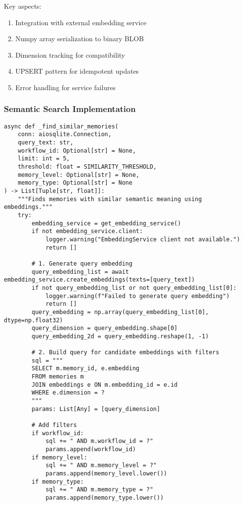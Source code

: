\documentclass[12pt,a4paper]{article}
\begin{document}
Key aspects:
\begin{enumerate}[label=\arabic*.]
    \item Integration with external embedding service
    \item Numpy array serialization to binary BLOB
    \item Dimension tracking for compatibility
    \item UPSERT pattern for idempotent updates
    \item Error handling for service failures
\end{enumerate}

\subsubsection*{Semantic Search Implementation}
\begin{pageablecode}
\begin{verbatim}
async def _find_similar_memories(
    conn: aiosqlite.Connection,
    query_text: str,
    workflow_id: Optional[str] = None,
    limit: int = 5,
    threshold: float = SIMILARITY_THRESHOLD,
    memory_level: Optional[str] = None,
    memory_type: Optional[str] = None
) -> List[Tuple[str, float]]:
    """Finds memories with similar semantic meaning using embeddings."""
    try:
        embedding_service = get_embedding_service()
        if not embedding_service.client:
            logger.warning("EmbeddingService client not available.")
            return []

        # 1. Generate query embedding
        query_embedding_list = await embedding_service.create_embeddings(texts=[query_text])
        if not query_embedding_list or not query_embedding_list[0]:
            logger.warning(f"Failed to generate query embedding")
            return []
        query_embedding = np.array(query_embedding_list[0], dtype=np.float32)
        query_dimension = query_embedding.shape[0]
        query_embedding_2d = query_embedding.reshape(1, -1)

        # 2. Build query for candidate embeddings with filters
        sql = """
        SELECT m.memory_id, e.embedding
        FROM memories m
        JOIN embeddings e ON m.embedding_id = e.id
        WHERE e.dimension = ?
        """
        params: List[Any] = [query_dimension]

        # Add filters
        if workflow_id:
            sql += " AND m.workflow_id = ?"
            params.append(workflow_id)
        if memory_level:
            sql += " AND m.memory_level = ?"
            params.append(memory_level.lower())
        if memory_type:
            sql += " AND m.memory_type = ?"
            params.append(memory_type.lower())


\end{verbatim}
\end{pageablecode}
\end{document}
